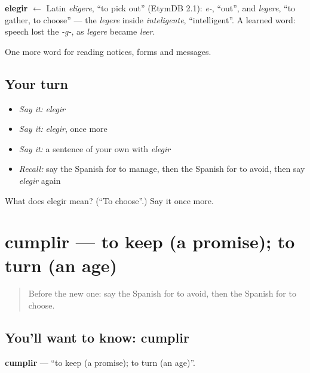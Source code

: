 \begin{cousinweb}
\textbf{elegir} $\leftarrow$ Latin \emph{eligere}, \textquotedblleft{}to pick out\textquotedblright{} (EtymDB 2.1): \emph{e-}, \textquotedblleft{}out\textquotedblright{}, and \emph{legere}, \textquotedblleft{}to gather, to choose\textquotedblright{} — the \emph{legere} inside \emph{inteligente}, \textquotedblleft{}intelligent\textquotedblright{}. A learned word: speech lost the \emph{-g-}, as \emph{legere} became \emph{leer}.
\end{cousinweb}

\begin{grammarlens}[title={What you've built}]
One more word for reading notices, forms and messages.
\end{grammarlens}

\subsection*{Your turn}
\begin{itemize}
\raggedright
  \item \emph{Say it:} \emph{elegir}
  \item \emph{Say it:} \emph{elegir}, once more
  \item \emph{Say it:} a sentence of your own with \emph{elegir}
  \item \emph{Recall:} say the Spanish for to manage, then the Spanish for to avoid, then say \emph{elegir} again
\end{itemize}

\begin{tcolorbox}[breakable,colback=teal!4,colframe=teal!35!black,title={Before you move on}]
What does elegir mean? (\textquotedblleft{}To choose\textquotedblright{}.) Say it once more.
\end{tcolorbox}
\section[cumplir]{cumplir — to keep (a promise); to turn (an age)}

\label{lesson:ES-C492-cumplir}



\begin{quote}
Before the new one: say the Spanish for to avoid, then the Spanish for to choose.
\end{quote}

\subsection*{You'll want to know: cumplir}
\textbf{cumplir} — \textquotedblleft{}to keep (a promise); to turn (an age)\textquotedblright{}.

